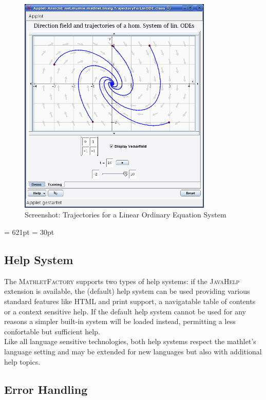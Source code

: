 \documentclass[a4paper,12pt]{article}
\newcommand{\name}[1]{\textsc{#1}}
\newcommand{\mf}{\name{MathletFactory }}
\begin{document}
\begin{figure}[h]
  \begin{center}
    \includegraphics[height=10.5cm]
      {images/screenshot_trajectory_linODE}
    \caption{Screenshot: Trajectories for a Linear Ordinary Equation System}
  \end{center}
\end{figure}

\textheight = 621pt
\newpage
\footskip = 30pt

\subsection{Help System}

The \mf supports two types of help systems: if the \name{JavaHelp} extension is available, the (default)
help system can be used providing various standard features like HTML and print support, a navigatable 
table of contents or a context sensitive help. If the default help system cannot be used for any reasons
a simpler built-in system will be loaded instead, permitting a less confortable but sufficient help.\\
Like all language sensitive technologies, both help systems respect the mathlet's language setting and
may be extended for new languages but also with additional help topics.

\subsection{Error Handling}
\end{document}
